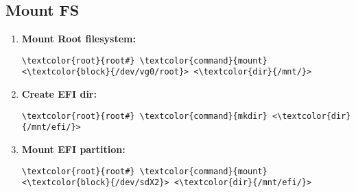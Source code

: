 \documentclass[10pt, a4paper, onecolumn, openany]{book} %
\begin{document}
\subsection{Mount FS}
\label{mount_fs}
\begin{enumerate}
    \item \textbf{Mount Root filesystem:}
\begin{Verbatim}[commandchars=\\\{\}]
\textcolor{root}{root#} \textcolor{command}{mount} <\textcolor{block}{/dev/vg0/root}> <\textcolor{dir}{/mnt/}>
\end{Verbatim}
    \item \textbf{Create EFI dir:}
\begin{Verbatim}[commandchars=\\\{\}]
\textcolor{root}{root#} \textcolor{command}{mkdir} <\textcolor{dir}{/mnt/efi/}>
\end{Verbatim}
    \item \textbf{Mount EFI partition:}
\begin{Verbatim}[commandchars=\\\{\}]
\textcolor{root}{root#} \textcolor{command}{mount} <\textcolor{block}{/dev/sdX2}> <\textcolor{dir}{/mnt/efi/}>
\end{Verbatim}
\end{enumerate}
\end{document}
